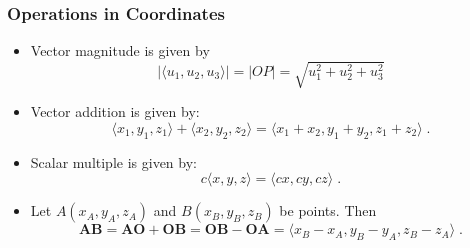 \begin{frame}
\frametitle{Operations in Coordinates}
\begin{itemize}
\item<1-> Vector magnitude is given by 
\[
|\langle u_1, u_2, u_3 \rangle| = |OP| = \sqrt{u_1^2+u_2^2+u_3^2}
\]
\item<2-> Vector addition is given by:
\[
\langle x_1,y_1,z_1 \rangle + \langle x_2, y_2,z_2\rangle = \langle x_1+x_2, y_1+y_2, z_1+z_2\rangle\; .
\]
\item<3-> Scalar multiple is given by:
\[
c\langle x, y, z\rangle = \langle cx, cy, cz\rangle\; .
\]
\item<4-> Let $A(x_A, y_A, z_A)$ and $B(x_B, y_B, z_B)$ be points. Then
\[
\bm{AB} = \bm{AO} +\bm{OB} = \bm{OB} - \bm{OA} = \langle x_B-x_A, y_B-y_A, z_B-z_A\rangle \; .
\]
\end{itemize}

\end{frame}